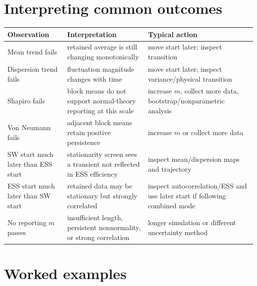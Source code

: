 \documentclass[11pt,oneside]{report}
\begin{document}
\chapter{Interpreting common outcomes}
\begin{table}[h]
\centering
\begin{tabularx}{\textwidth}{lYY}
\toprule
Observation & Interpretation & Typical action\\
\midrule
Mean trend fails & retained average is still changing monotonically & move start later; inspect transition\\
Dispersion trend fails & fluctuation magnitude changes with time & move start later; inspect variance/physical transition\\
Shapiro fails & block means do not support normal-theory reporting at this scale & increase $m$, collect more data, bootstrap/nonparametric analysis\\
Von Neumann fails & adjacent block means retain positive persistence & increase $m$ or collect more data\\
SW start much later than ESS start & stationarity screen sees a transient not reflected in ESS efficiency & inspect mean/dispersion maps and trajectory\\
ESS start much later than SW start & retained data may be stationary but strongly correlated & inspect autocorrelation/ESS and use later start if following combined mode\\
No reporting $m$ passes & insufficient length, persistent nonnormality, or strong correlation & longer simulation or different uncertainty method\\
\bottomrule
\end{tabularx}
\end{table}

\chapter{Worked examples}
\end{document}
